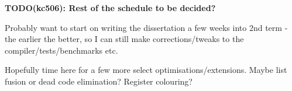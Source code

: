 \documentclass[12pt]{article}
\newcommand\todo[1]{\textbf{TODO(kc506): #1}}
\begin{document}
\begin{itemize}
{    \todo{Rest of the schedule to be decided?}

    Probably want to start on writing the dissertation a few weeks into 2nd term - the earlier the better, so I can
    still make corrections/tweaks to the compiler/tests/benchmarks etc.

    Hopefully time here for a few more select optimisations/extensions. Maybe list fusion or dead code elimination?
    Register colouring?
}
\end{itemize}
\end{document}
